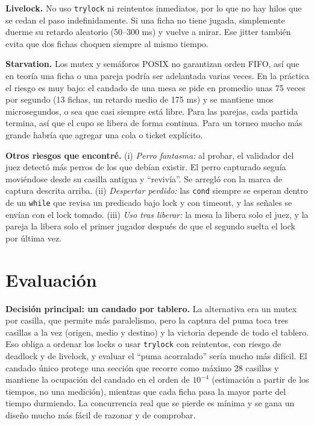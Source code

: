 \documentclass[11pt,a4paper]{article}
\newcommand{\cod}[1]{\texttt{\small #1}}
\begin{document}
\textbf{Livelock.} No uso \cod{trylock} ni reintentos inmediatos, por lo que no hay hilos que se cedan el paso indefinidamente. Si una ficha no tiene jugada, simplemente duerme su retardo aleatorio (50--300 ms) y vuelve a mirar. Ese jitter también evita que dos fichas choquen siempre al mismo tiempo.

\textbf{Starvation.} Los mutex y semáforos POSIX no garantizan orden FIFO, así que en teoría una ficha o una pareja podría ser adelantada varias veces. En la práctica el riesgo es muy bajo: el candado de una mesa se pide en promedio unas 75 veces por segundo (13 fichas, un retardo medio de 175 ms) y se mantiene unos microsegundos, o sea que casi siempre está libre. Para las parejas, cada partida termina, así que el cupo se libera de forma continua. Para un torneo mucho más grande habría que agregar una cola o ticket explícito.

\textbf{Otros riesgos que encontré.} (i) \emph{Perro fantasma:} al probar, el validador del juez detectó más perros de los que debían existir. El perro capturado seguía moviéndose desde su casilla antigua y ``revivía''. Se arregló con la marca de captura descrita arriba. (ii) \emph{Despertar perdido:} las \cod{cond} siempre se esperan dentro de un \cod{while} que revisa un predicado bajo lock y con timeout, y las señales se envían con el lock tomado. (iii) \emph{Uso tras liberar:} la mesa la libera solo el juez, y la pareja la libera solo el primer jugador después de que el segundo suelta el lock por última vez.

\section{Evaluación}

\textbf{Decisión principal: un candado por tablero.} La alternativa era un mutex por casilla, que permite más paralelismo, pero la captura del puma toca tres casillas a la vez (origen, medio y destino) y la victoria depende de todo el tablero. Eso obliga a ordenar los locks o usar \cod{trylock} con reintentos, con riesgo de deadlock y de livelock, y evaluar el ``puma acorralado'' sería mucho más difícil. El candado único protege una sección que recorre como máximo 28 casillas y mantiene la ocupación del candado en el orden de $10^{-4}$ (estimación a partir de los tiempos, no una medición), mientras que cada ficha pasa la mayor parte del tiempo durmiendo. La concurrencia real que se pierde es mínima y se gana un diseño mucho más fácil de razonar y de comprobar.
\end{document}
